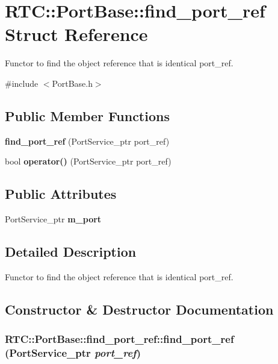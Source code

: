 \section{RTC::PortBase::find\_\-port\_\-ref Struct Reference}
\label{structRTC_1_1PortBase_1_1find__port__ref}


Functor to find the object reference that is identical port\_\-ref.  




{\ttfamily \#include $<$PortBase.h$>$}

\subsection*{Public Member Functions}
\begin{DoxyCompactItemize}
\item 
{\bf find\_\-port\_\-ref} (PortService\_\-ptr port\_\-ref)
\item 
bool {\bf operator()} (PortService\_\-ptr port\_\-ref)
\end{DoxyCompactItemize}
\subsection*{Public Attributes}
\begin{DoxyCompactItemize}
\item 
PortService\_\-ptr {\bf m\_\-port}
\end{DoxyCompactItemize}


\subsection{Detailed Description}
Functor to find the object reference that is identical port\_\-ref. 

\subsection{Constructor \& Destructor Documentation}
\subsubsection[{find\_\-port\_\-ref}]{\setlength{\rightskip}{0pt plus 5cm}RTC::PortBase::find\_\-port\_\-ref::find\_\-port\_\-ref (PortService\_\-ptr {\em port\_\-ref})\hspace{0.3cm}{\ttfamily  [inline]}}\label{structRTC_1_1PortBase_1_1find__port__ref_a67c224b2a7b154dd2654f759576fea52}


